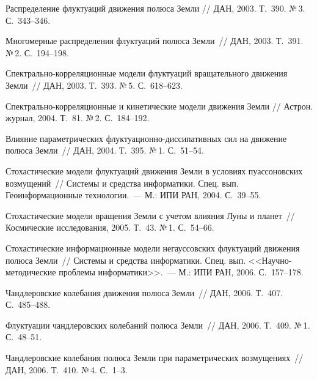 \begin{multicols}{2}
{{\begin{thebibliography}{99}
 Распределение флуктуаций движения полюса Земли // ДАН, 2003. Т.~390. №\,3. С.~343--346.

Многомерные распределения
флуктуаций полюса Земли~// ДАН, 2003. Т.~391. №\,2. С.~194--198.

Спектрально-кор\-ре\-ля\-ци\-онные модели флуктуаций вращательного
движения Земли~// ДАН, 2003. Т.~393. №\,5. С.~618--623.

 Спектрально-корреляционные и кинетические 
модели движения Земли // Астрон. журнал, 2004. Т.~81. №\,2. С.~184--192.
{

}
Влияние параметрических флуктуационно-диссипативных сил на движение
полюса Земли~// ДАН, 2004. Т.~395. №\,1. С.~51--54.
{

}
Стохастические модели флуктуаций движения Земли в условиях пуассоновских
возмущений~// Системы и средства информатики.
Спец. вып. Геоинформационные технологии.~--- М.: ИПИ РАН, 2004. С.~39--55.

Стохастические модели вращения Земли с учетом влияния Луны и планет~//
Космические исследования, 2005. Т.~43. №\,1. С.~54--66.

Стохастические информационные модели негауссовских флуктуаций движения
полюса Земли~// Системы и средства информатики. Спец. вып.
<<Научно-методические проблемы информатики>>.~---
М.: ИПИ РАН, 2006. С.~157--178.

Чандлеровские колебания движения полюса Земли~//
ДАН, 2006. Т.~407. С.~485--488.

Флуктуации чандлеровских колебаний полюса Земли~//
ДАН, 2006. Т.~409. №\,1. С.~48--51.

Чандлеровские колебания полюса Земли при параметрических возмущениях~//
ДАН, 2006. Т.~410. №\,4. С.~1--3.


\end{thebibliography}}}
\end{multicols}
